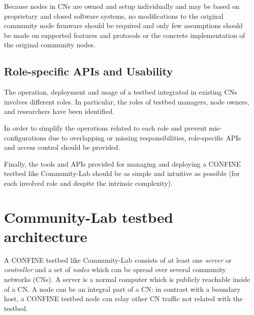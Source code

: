 \documentclass[conference]{IEEEtran}
\begin{document}
Because nodes in CNs are owned and setup individually and may be based
on proprietary and closed software systems, no modifications to the
original community node firmware should be required and only few
assumptions should be made on supported features and protocols or the
concrete implementation of the original community nodes.


\subsection{Role-specific APIs and Usability}

The operation, deployment and usage of a testbed integrated in
existing CNs involves different roles. In particular, the roles of
testbed managers, node owners, and researchers have been identified.

In order to simplify the operations related to each role and prevent
mis-configurations due to overlapping or missing responsibilities,
role-specific APIs  and access control should be provided.

Finally, the tools and APIs provided for managing and deploying a
CONFINE testbed like Community-Lab should be as simple and intuitive as possible (for
each involved role and despite the intrinsic complexity).







\section{Community-Lab testbed architecture}
\label{sec:confine-architecture}

A CONFINE testbed like Community-Lab consists of at least one \emph{server} or \emph{controller}
and a set of \emph{nodes} which can be spread over several community networks
(CNs).  A server is a normal computer which is publicly reachable inside of a
CN.  A node can be an integral part of a CN: in contrast with a boundary host,
a CONFINE testbed node can relay other CN traffic not related with the testbed.
\end{document}

